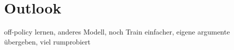 \chapter{Outlook}
off-policy lernen, anderes Modell, noch 
Train einfacher, eigene argumente übergeben, viel rumprobiert